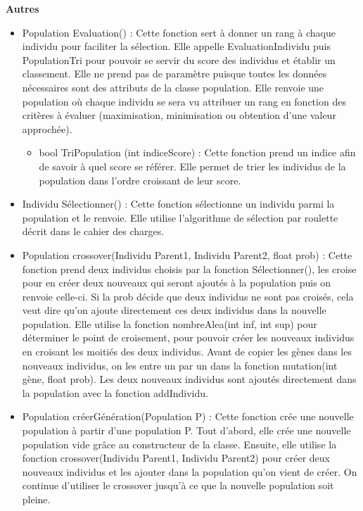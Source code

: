 \documentclass[a4paper,11pt]{article}
\begin{document}
			\textbf{Autres}
				\begin{itemize}
							\item Population Evaluation() : Cette fonction sert à donner un rang à chaque individu pour faciliter la sélection. 
								Elle appelle EvaluationIndividu puis PopulationTri pour pouvoir se servir du score des individus et établir un classement. 
								Elle ne prend pas de paramètre puisque toutes les données nécessaires sont des attributs de la classe population. 
								Elle renvoie une population où chaque individu se sera vu attribuer un rang en fonction des critères à évaluer (maximisation, minimisation ou obtention d’une valeur approchée).\vspace{0.2cm}
								\begin{itemize}
								\item bool TriPopulation (int indiceScore) : Cette fonction prend un indice afin de savoir à quel score se référer. 
									Elle permet de trier les individus de la population dans l’ordre croissant de leur score.\vspace{0.2cm}
								\end{itemize}
							
							\item Individu Sélectionner() : Cette fonction sélectionne un individu parmi la population et le renvoie. 
								Elle utilise l’algorithme de sélection par roulette décrit dans le cahier des charges.\vspace{0.2cm}
								
							\item Population crossover(Individu Parent1, Individu Parent2, float prob) : Cette fonction prend deux individus choisis par la fonction Sélectionner(), les croise pour en créer deux nouveaux qui seront ajoutés à la population puis on renvoie celle-ci. 
							Si la prob décide que deux individus ne sont pas croisés, cela veut dire qu’on ajoute directement ces deux individus dans la nouvelle population. 
								Elle utilise la fonction nombreAlea(int inf, int sup) pour déterminer le point de croisement, pour pouvoir créer les nouveaux individus en croisant les moitiés des deux individus.
								Avant de copier les gènes dans les nouveaux individus, on les entre un par un dans la fonction mutation(int gène, float prob). 
								Les deux nouveaux individus sont ajoutés directement dans la population  avec la fonction addIndividu.\vspace{0.2cm}
							
							\item Population créerGénération(Population P) : Cette fonction crée une nouvelle population à partir d’une population P.
								Tout d’abord, elle crée une nouvelle population vide grâce au constructeur de la classe. 
								Ensuite, elle utilise la fonction crossover(Individu Parent1, Individu Parent2) pour créer deux nouveaux individus et les ajouter dans la population qu’on vient de créer.
								On continue d’utiliser le crossover jusqu’à ce que la nouvelle population soit pleine.\vspace{0.2cm}
							

\end{itemize}
\end{document}
